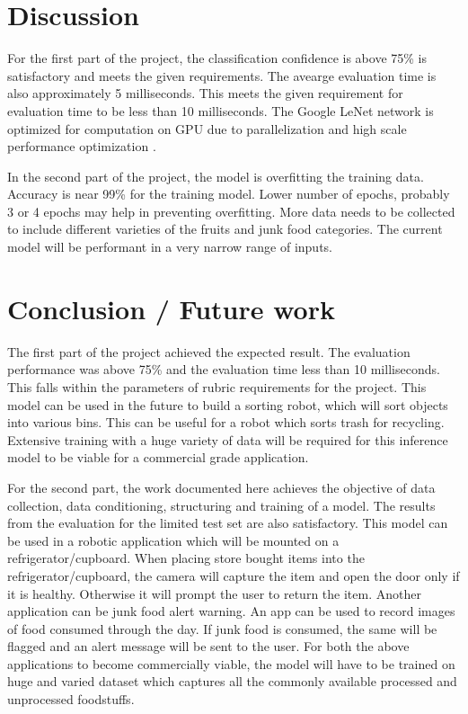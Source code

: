 \documentclass[10pt,journal,compsoc]{IEEEtran}
\begin{document}
\section{Discussion}
For the first part of the project, the classification confidence is above 75\% is satisfactory and meets the given requirements. The avearge evaluation time is also approximately 5 milliseconds. This meets the given requirement for evaluation time to be less than 10 milliseconds. The Google LeNet network is optimized for computation on GPU due to parallelization and high scale performance optimization \cite{DBLP}.

In the second part of the project, the model is overfitting the training data. Accuracy is near 99\% for the training model. Lower number of epochs, probably 3 or 4 epochs may help in preventing overfitting. More data needs to be collected to include different varieties of the fruits and junk food categories. The current model will be performant in a very narrow range of inputs. 

\section{Conclusion / Future work}
The first part of the project achieved the expected result. The evaluation performance was above 75\% and the evaluation time less than 10 milliseconds. This falls within the parameters of rubric requirements for the project. This model can be used in the future to build a sorting robot, which will sort objects into various bins. This can be useful for a robot which sorts trash for recycling. Extensive training with a huge variety of data will be required for this inference model to be viable for a commercial grade application.

For the second part, the work documented here achieves the objective of data collection, data conditioning, structuring and training of a model. The results from the evaluation for the limited test set are also satisfactory. This model can be used in a robotic application which will be mounted on a refrigerator/cupboard. When placing store bought items into the refrigerator/cupboard, the camera will capture the item and open the door only if it is healthy. Otherwise it will prompt the user to return the item. Another application can be junk food alert warning. An app can be used to record images of food consumed through the day. If junk food is consumed, the same will be flagged and an alert message will be sent to the user. 
For both the above applications to become commercially viable, the model will have to be trained on huge and varied dataset which captures all the commonly available processed and unprocessed foodstuffs.



\end{document}
